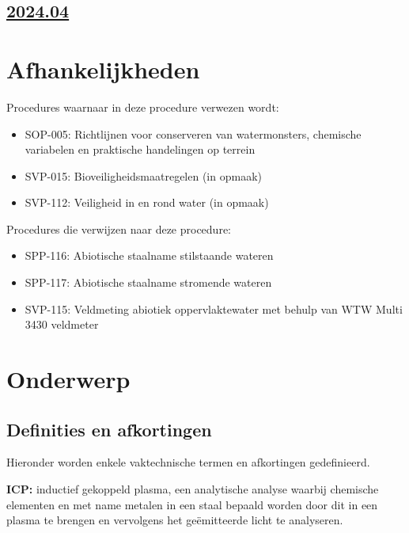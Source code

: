 \documentclass[
]{scrreprt}
\begin{document}
\section{\texorpdfstring{\href{../2024.04/index.html}{2024.04}}{2024.04}}\label{section}

\chapter{Afhankelijkheden}\label{afhankelijkheden}

Procedures waarnaar in deze procedure verwezen wordt:

\begin{itemize}
\item
  SOP-005: Richtlijnen voor conserveren van watermonsters, chemische variabelen en praktische handelingen op terrein
\item
  SVP-015: Bioveiligheidsmaatregelen (in opmaak)
\item
  SVP-112: Veiligheid in en rond water (in opmaak)
\end{itemize}

Procedures die verwijzen naar deze procedure:

\begin{itemize}
\item
  SPP-116: Abiotische staalname stilstaande wateren
\item
  SPP-117: Abiotische staalname stromende wateren
\item
  SVP-115: Veldmeting abiotiek oppervlaktewater met behulp van WTW Multi 3430 veldmeter
\end{itemize}

\chapter{Onderwerp}\label{onderwerp}

\section{Definities en afkortingen}\label{definities-en-afkortingen}

Hieronder worden enkele vaktechnische termen en afkortingen gedefinieerd.

\textbf{ICP:} inductief gekoppeld plasma, een analytische analyse waarbij chemische elementen en met name metalen in een staal bepaald worden door dit in een plasma te brengen en vervolgens het geëmitteerde licht te analyseren.
\end{document}
